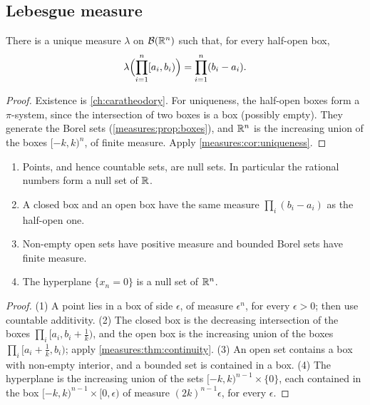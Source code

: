 \begin{notechapter}
\section{Lebesgue measure}\label{measures:sec:lebesgue}

\begin{theorem}\label{measures:thm:lebesgue}
There is a unique measure $\lambda$ on $\mathcal B(\mathbb{R}^n)$ such that, for
every half-open box,
\[
  \lambda\Bigl(\prod_{i=1}^n[a_i, b_i)\Bigr) = \prod_{i=1}^n(b_i - a_i) .
\]
\end{theorem}

\begin{proof}
Existence is \cref{ch:caratheodory}. For uniqueness, the half-open boxes
form a $\pi$-system, since the intersection of two boxes is a box
(possibly empty). They generate the Borel sets
(\cref{measures:prop:boxes}), and $\mathbb{R}^n$ is the increasing union of the
boxes $[-k, k)^n$, of finite measure. Apply
\cref{measures:cor:uniqueness}.
\end{proof}

\begin{proposition}\label{measures:prop:lebesgue}
\begin{enumerate}[nosep]
  \item Points, and hence countable sets, are null sets. In particular
        the rational numbers form a null set of $\mathbb{R}$.
  \item A closed box and an open box have the same measure
        $\prod_i(b_i - a_i)$ as the half-open one.
  \item Non-empty open sets have positive measure and bounded Borel sets
        have finite measure.
  \item The hyperplane $\{x_n = 0\}$ is a null set of $\mathbb{R}^n$.
\end{enumerate}
\end{proposition}

\begin{proof}
(1) A point lies in a box of side $\epsilon$, of measure $\epsilon^n$,
for every $\epsilon > 0$; then use countable additivity. (2) The closed
box is the decreasing intersection of the boxes
$\prod_i[a_i, b_i + \frac1k)$, and the open box is the increasing union
of the boxes $\prod_i[a_i + \frac1k, b_i)$; apply
\cref{measures:thm:continuity}. (3) An open set contains a box with
non-empty interior, and a bounded set is contained in a box. (4) The
hyperplane is the increasing union of the sets
$[-k, k)^{n-1}\times\{0\}$, each contained in the box
$[-k, k)^{n-1}\times[0, \epsilon)$ of measure $(2k)^{n-1}\epsilon$, for
every $\epsilon$.
\end{proof}


\end{notechapter}
